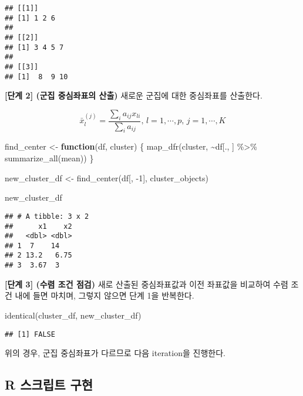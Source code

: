 \documentclass[
]{book}
\newenvironment{Shaded}{\begin{snugshade}}{\end{snugshade}}
\newcommand{\ControlFlowTok}[1]{\textcolor[rgb]{0.13,0.29,0.53}{\textbf{#1}}}
\newcommand{\DecValTok}[1]{\textcolor[rgb]{0.00,0.00,0.81}{#1}}
\newcommand{\FunctionTok}[1]{\textcolor[rgb]{0.00,0.00,0.00}{#1}}
\newcommand{\NormalTok}[1]{#1}
\newcommand{\OtherTok}[1]{\textcolor[rgb]{0.56,0.35,0.01}{#1}}
\newcommand{\SpecialCharTok}[1]{\textcolor[rgb]{0.00,0.00,0.00}{#1}}
\begin{document}
\begin{verbatim}
## [[1]]
## [1] 1 2 6
## 
## [[2]]
## [1] 3 4 5 7
## 
## [[3]]
## [1]  8  9 10
\end{verbatim}

\textbf{{[}단계 2{]} (군집 중심좌표의 산출)} 새로운 군집에 대한 중심좌표를 산출한다.

\begin{equation*}
\bar{x}^{(j)}_l = \frac{\sum_{i} a_{ij} x_{li}}{\sum_{i} a_{ij}}, \, l = 1, \cdots, p, \, j = 1, \cdots, K
\end{equation*}

\begin{Shaded}
\begin{Highlighting}[]
\NormalTok{find\_center }\OtherTok{\textless{}{-}} \ControlFlowTok{function}\NormalTok{(df, cluster) \{}
  \FunctionTok{map\_dfr}\NormalTok{(cluster, }\SpecialCharTok{\textasciitilde{}}\NormalTok{df[., ] }\SpecialCharTok{\%\textgreater{}\%} \FunctionTok{summarize\_all}\NormalTok{(mean)) }
\NormalTok{\}}

\NormalTok{new\_cluster\_df }\OtherTok{\textless{}{-}} \FunctionTok{find\_center}\NormalTok{(df[, }\SpecialCharTok{{-}}\DecValTok{1}\NormalTok{], cluster\_objects)}

\NormalTok{new\_cluster\_df}
\end{Highlighting}
\end{Shaded}

\begin{verbatim}
## # A tibble: 3 x 2
##      x1    x2
##   <dbl> <dbl>
## 1  7    14   
## 2 13.2   6.75
## 3  3.67  3
\end{verbatim}

\textbf{{[}단계 3{]} (수렴 조건 점검)} 새로 산출된 중심좌표값과 이전 좌표값을 비교하여 수렴 조건 내에 들면 마치며, 그렇지 않으면 단계 1을 반복한다.

\begin{Shaded}
\begin{Highlighting}[]
\FunctionTok{identical}\NormalTok{(cluster\_df, new\_cluster\_df)}
\end{Highlighting}
\end{Shaded}

\begin{verbatim}
## [1] FALSE
\end{verbatim}

위의 경우, 군집 중심좌표가 다르므로 다음 iteration을 진행한다.

\hypertarget{kmeans-user-defined-functions}{%
\subsection{R 스크립트 구현}\label{kmeans-user-defined-functions}}
\end{document}
